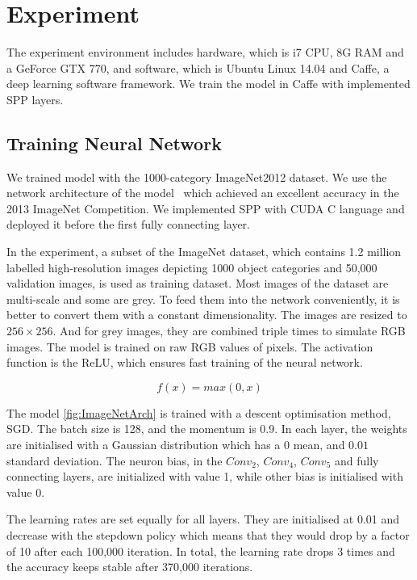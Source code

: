 
\chapter{Experiment} %
\label{Chapter4}

The experiment environment includes hardware, which is i7 CPU, 8G RAM and a GeForce GTX 770, and software, which is Ubuntu Linux 14.04 and Caffe\citep{jia2014caffe}, a deep learning software framework. We train the model in Caffe with implemented SPP layers.

\section{Training Neural Network}

We trained model with the 1000-category ImageNet2012 dataset. We use the network architecture of the model~\cite{ZeilerF13} which achieved an excellent accuracy in the 2013 ImageNet Competition. We implemented SPP with CUDA C language and deployed it before the first fully connecting layer.

In the experiment, a subset of the ImageNet dataset, which contains 1.2 million labelled high-resolution images depicting 1000 object categories and 50,000 validation images, is used as training dataset. Most images of the dataset are multi-scale and some are grey. To feed them into the network conveniently, it is better to convert them with a constant dimensionality. The images are resized to $256\times256$. And for grey images, they are combined triple times to simulate RGB images. The model is trained on raw RGB values of pixels. The activation function is the ReLU, which ensures fast training of the neural network.

\begin{equation}\label{eq:ReLU}
f(x) = max(0, x)
\end{equation}

The model \ref{fig:ImageNetArch} is trained with a descent optimisation method, SGD. The batch size is 128, and the momentum is 0.9.  In each layer, the weights are initialised with a Gaussian distribution which has  a $0$ mean, and $0.01$ standard deviation. The neuron bias, in the $Conv_{2}$, $Conv_{4}$, $Conv_{5}$ and fully connecting layers, are initialized with value 1, while other bias is initialised with value 0.

The learning rates are set equally for all layers. They are initialised at 0.01 and decrease with the stepdown policy which means that they would drop by a factor of 10 after each 100,000 iteration. In total, the learning rate drops 3 times and the accuracy keeps stable after 370,000 iterations. 


